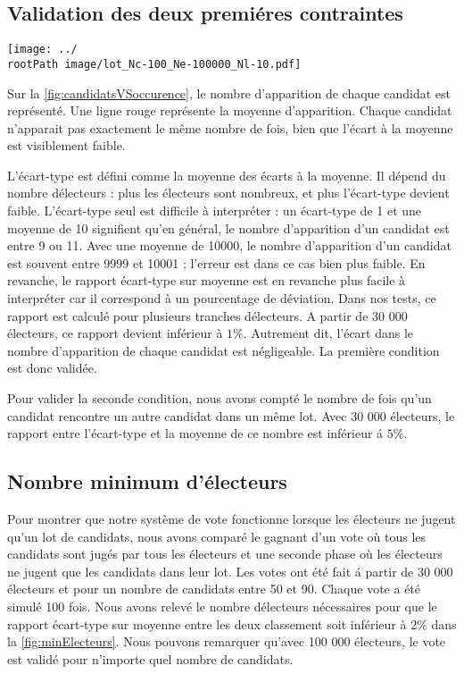 \documentclass[conference]{IEEEtran}
\newcommand*{\rootPath}{../}
\begin{document}
\subsection{Validation des deux premi\'eres contraintes}

\begin{figure*}[!ht]
  \centering
  \texttt{[image: ../\\rootPath image/lot\_Nc-100\_Ne-100000\_Nl-10.pdf]}
  \caption{Avec 100000 \'electeurs et 100 candidats, chaque candidat apparait autant de fois que les autres candidats dans les lots}
  \label{fig:candidatsVSoccurence}
\end{figure*}

Sur la \cref{fig:candidatsVSoccurence}, le nombre d'apparition de chaque candidat est repr\'esent\'e. Une ligne rouge repr\'esente la moyenne d'apparition. Chaque candidat n'apparait pas exactement le m\^eme nombre de fois, bien que l'\'ecart \`a la moyenne est visiblement faible. 

L'\'ecart-type est d\'efini comme la moyenne des \'ecarts \`a la moyenne. Il d\'epend du nombre d\'electeurs : plus les \'electeurs sont nombreux, et plus l'\'ecart-type devient faible. L'\'ecart-type seul est difficile \`a interpr\'eter : un \'ecart-type de 1 et une moyenne de 10 signifient qu'en g\'en\'eral, le nombre d'apparition d'un candidat est entre 9 ou 11. Avec une moyenne  de 10000, le nombre d'apparition d'un candidat est souvent entre 9999 et 10001 ; l'erreur est dans ce cas bien plus faible. En revanche, le rapport \'ecart-type sur moyenne est en revanche plus facile \`a interpr\'eter car il correspond \`a un pourcentage de d\'eviation. Dans nos tests, ce rapport est calcul\'e pour plusieurs tranches d\'electeurs. A partir de 30 000 \'electeurs, ce rapport devient inf\'erieur \`a $1\%$. Autrement dit, l'\'ecart dans le nombre d'apparition de chaque candidat est n\'egligeable.
La premi\`ere condition est donc valid\'ee. 

Pour valider la seconde condition, nous avons compt\'e le nombre de fois qu'un candidat rencontre un autre candidat dans un m\^eme lot. Avec 30 000 \'electeurs, le rapport entre l'\'ecart-type et la moyenne de ce nombre est inf\'erieur \'a $5\%$.




\subsection{Nombre minimum d'\'electeurs}


Pour montrer que notre syst\`eme de vote fonctionne lorsque les \'electeurs ne jugent qu'un lot de candidats, nous avons compar\'e le gagnant d'un vote o\`u tous les candidats sont jug\'es par tous les \'electeurs et une seconde phase o\`u les \'electeurs ne jugent que les candidats dans leur lot. Les votes ont \'et\'e fait \'a partir de 30 000 \'electeurs et pour un nombre de candidats entre 50 et 90. Chaque vote a \'et\'e simul\'e 100 fois. Nous avons relev\'e le nombre d\'electeurs n\'ecessaires pour que le rapport \'ecart-type sur moyenne entre les deux classement soit inf\'erieur \`a $2\%$ dans la \cref{fig:minElecteurs}. Nous pouvons remarquer qu'avec 100 000 \'electeurs, le vote est valid\'e pour n'importe quel nombre de candidats.
\end{document}
